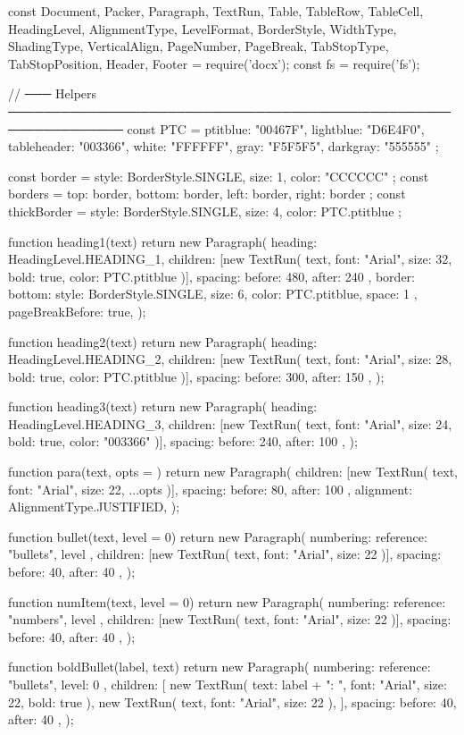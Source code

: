 const {
  Document, Packer, Paragraph, TextRun, Table, TableRow, TableCell,
  HeadingLevel, AlignmentType, LevelFormat, BorderStyle, WidthType,
  ShadingType, VerticalAlign, PageNumber, PageBreak, TabStopType,
  TabStopPosition, Header, Footer
} = require('docx');
const fs = require('fs');

// ─── Helpers ───────────────────────────────────────────────────────────────
const PTC = { ptitblue: "00467F", lightblue: "D6E4F0", tableheader: "003366", white: "FFFFFF", gray: "F5F5F5", darkgray: "555555" };

const border = { style: BorderStyle.SINGLE, size: 1, color: "CCCCCC" };
const borders = { top: border, bottom: border, left: border, right: border };
const thickBorder = { style: BorderStyle.SINGLE, size: 4, color: PTC.ptitblue };

function heading1(text) {
  return new Paragraph({
    heading: HeadingLevel.HEADING_1,
    children: [new TextRun({ text, font: "Arial", size: 32, bold: true, color: PTC.ptitblue })],
    spacing: { before: 480, after: 240 },
    border: { bottom: { style: BorderStyle.SINGLE, size: 6, color: PTC.ptitblue, space: 1 } },
    pageBreakBefore: true,
  });
}

function heading2(text) {
  return new Paragraph({
    heading: HeadingLevel.HEADING_2,
    children: [new TextRun({ text, font: "Arial", size: 28, bold: true, color: PTC.ptitblue })],
    spacing: { before: 300, after: 150 },
  });
}

function heading3(text) {
  return new Paragraph({
    heading: HeadingLevel.HEADING_3,
    children: [new TextRun({ text, font: "Arial", size: 24, bold: true, color: "003366" })],
    spacing: { before: 240, after: 100 },
  });
}

function para(text, opts = {}) {
  return new Paragraph({
    children: [new TextRun({ text, font: "Arial", size: 22, ...opts })],
    spacing: { before: 80, after: 100 },
    alignment: AlignmentType.JUSTIFIED,
  });
}

function bullet(text, level = 0) {
  return new Paragraph({
    numbering: { reference: "bullets", level },
    children: [new TextRun({ text, font: "Arial", size: 22 })],
    spacing: { before: 40, after: 40 },
  });
}

function numItem(text, level = 0) {
  return new Paragraph({
    numbering: { reference: "numbers", level },
    children: [new TextRun({ text, font: "Arial", size: 22 })],
    spacing: { before: 40, after: 40 },
  });
}

function boldBullet(label, text) {
  return new Paragraph({
    numbering: { reference: "bullets", level: 0 },
    children: [
      new TextRun({ text: label + ": ", font: "Arial", size: 22, bold: true }),
      new TextRun({ text, font: "Arial", size: 22 }),
    ],
    spacing: { before: 40, after: 40 },
  });
}

